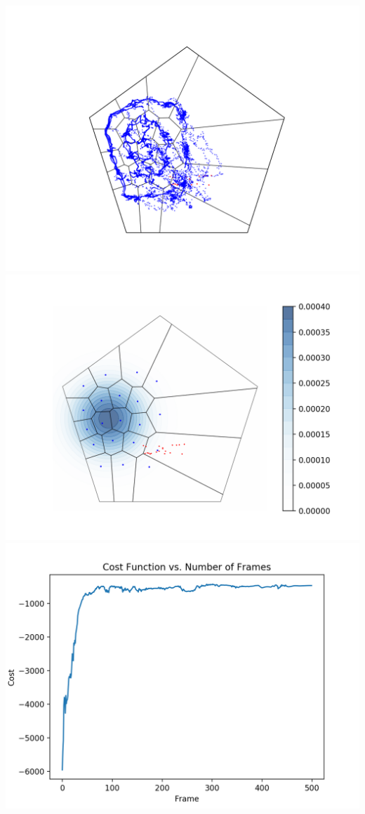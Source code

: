 \documentclass[landscape,a0paper,fontscale=0.292]{baposter}
\begin{document}
\begin{poster}
{
	\begin{center}
		\includegraphics[scale=.25]{poster_sim1_tracking}
		\includegraphics[scale=.25]{poster_sim1_final}
		\includegraphics[scale=.25]{poster_sim1_cost_}

\end{center}}
\end{poster}
\end{document}
